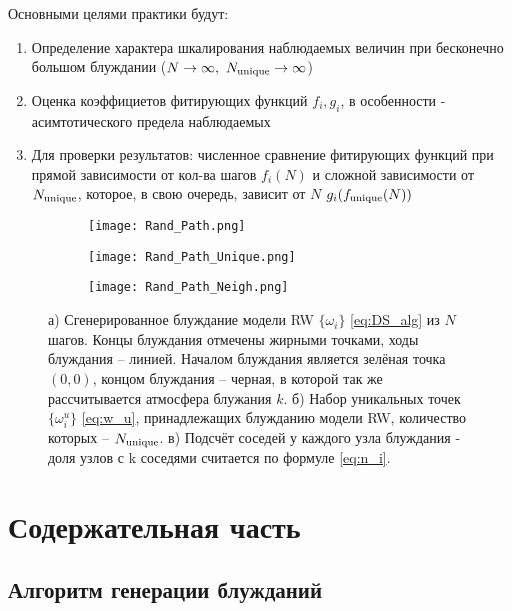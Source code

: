 Основными целями практики будут:

\begin{enumerate}
\item Определение характера шкалирования наблюдаемых величин при бесконечно большом блуждании ($N \to \infty,\ \Nun \to \infty$)
\item Оценка коэффициетов фитирующих функций $f_i, g_i$, в особенности - асимтотического предела наблюдаемых
\item Для проверки результатов: численное сравнение фитирующих функций при прямой зависимости от кол-ва шагов $f_i(N)$ и сложной зависимости от $N_{\textup{unique}}$, которое, в свою очередь, зависит от $N$ $g_i(f_{\textup{unique}}(N))$
\end{enumerate}



\begin{figure}[h]
    
\begin{subfigure}{0.5\textwidth}
    \texttt{[image: Rand\_Path.png]}
    \caption{}
    \label{fig:path_1}
\end{subfigure}
\hfill
\begin{subfigure}{0.5\textwidth}
    \texttt{[image: Rand\_Path\_Unique.png]}
    \caption{}
    \label{fig:path_2}
\end{subfigure}
\vfill
\centering
\begin{subfigure}{0.5\textwidth}
\texttt{[image: Rand\_Path\_Neigh.png]}
\caption{}
\label{fig:path_3}
\end{subfigure}
\caption{
а) Сгенерированное блуждание модели RW $\{\omega_i\}$ \eqref{eq:DS_alg} из $N$ шагов. Концы блуждания отмечены жирными точками, ходы блуждания -- линией. 
Началом блуждания является зелёная точка $(0,0)$, концом блуждания -- черная, в которой так же рассчитывается атмосфера блужания $k$. 
б) Набор уникальных точек $\{\omega^u_i\}$ \eqref{eq:w_u}, принадлежащих блужданию модели RW, количество которых -- $N_{\textup{unique}}$. 
в) Подсчёт соседей у каждого узла блуждания - доля узлов с k соседями считается по формуле \eqref{eq:n_i}.
}
\label{fig:path_alg}
\end{figure}

\section{Содержательная часть}

\subsection{Алгоритм генерации блужданий}

